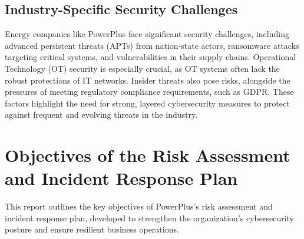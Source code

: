 \subsection{Industry-Specific Security Challenges}


Energy companies like PowerPlus face significant security challenges, including advanced persistent threats (APTs) from nation-state actors, ransomware attacks targeting critical systems, and vulnerabilities in their supply chains. Operational Technology (OT) security is especially crucial, as OT systems often lack the robust protections of IT networks. Insider threats also pose risks, alongside the pressures of meeting regulatory compliance requirements, such as GDPR. These factors highlight the need for strong, layered cybersecurity measures to protect against frequent and evolving threats in the industry.

\section{Objectives of the Risk Assessment and Incident Response Plan}


This report outlines the key objectives of PowerPlus’s risk assessment and incident response plan, developed to strengthen the organization’s cybersecurity posture and ensure resilient business operations.

